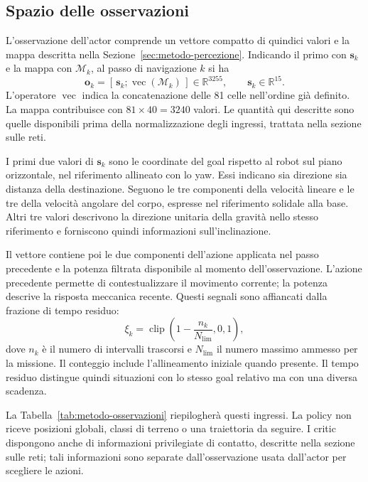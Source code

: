 \subsection{Spazio delle osservazioni}

L'osservazione dell'actor comprende un vettore compatto di quindici valori e la mappa descritta nella Sezione~\ref{sec:metodo-percezione}. Indicando il primo con $\mathbf s_k$ e la mappa con $\mathcal M_k$, al passo di navigazione $k$ si ha
\begin{equation}
    \mathbf o_k=
       [\,\mathbf s_k;\operatorname{vec}(\mathcal M_k)\,]
       \in\mathbb R^{3255},
    \qquad \mathbf s_k\in\mathbb R^{15}.
    \label{eq:metodo-osservazione-actor}
\end{equation}
L'operatore $\operatorname{vec}$ indica la concatenazione delle 81 celle nell'ordine già definito. La mappa contribuisce con $81\times40=3240$ valori. Le quantità qui descritte sono quelle disponibili prima della normalizzazione degli ingressi, trattata nella sezione sulle reti.

I primi due valori di $\mathbf s_k$ sono le coordinate del goal rispetto al robot sul piano orizzontale, nel riferimento allineato con lo yaw. Essi indicano sia direzione sia distanza della destinazione. Seguono le tre componenti della velocità lineare e le tre della velocità angolare del corpo, espresse nel riferimento solidale alla base. Altri tre valori descrivono la direzione unitaria della gravità nello stesso riferimento e forniscono quindi informazioni sull'inclinazione.

Il vettore contiene poi le due componenti dell'azione applicata nel passo precedente e la potenza filtrata disponibile al momento dell'osservazione. L'azione precedente permette di contestualizzare il movimento corrente; la potenza descrive la risposta meccanica recente. Questi segnali sono affiancati dalla frazione di tempo residuo:
\begin{equation}
    \xi_k=\operatorname{clip}
          \left(1-\frac{n_k}{N_{\mathrm{lim}}},0,1\right),
    \label{eq:metodo-tempo-residuo}
\end{equation}
dove $n_k$ è il numero di intervalli trascorsi e $N_{\mathrm{lim}}$ il numero massimo ammesso per la missione. Il conteggio include l'allineamento iniziale quando presente. Il tempo residuo distingue quindi situazioni con lo stesso goal relativo ma con una diversa scadenza.

La Tabella~\ref{tab:metodo-osservazioni} riepilogherà questi ingressi. La policy non riceve posizioni globali, classi di terreno o una traiettoria da seguire. I critic dispongono anche di informazioni privilegiate di contatto, descritte nella sezione sulle reti; tali informazioni sono separate dall'osservazione usata dall'actor per scegliere le azioni.

